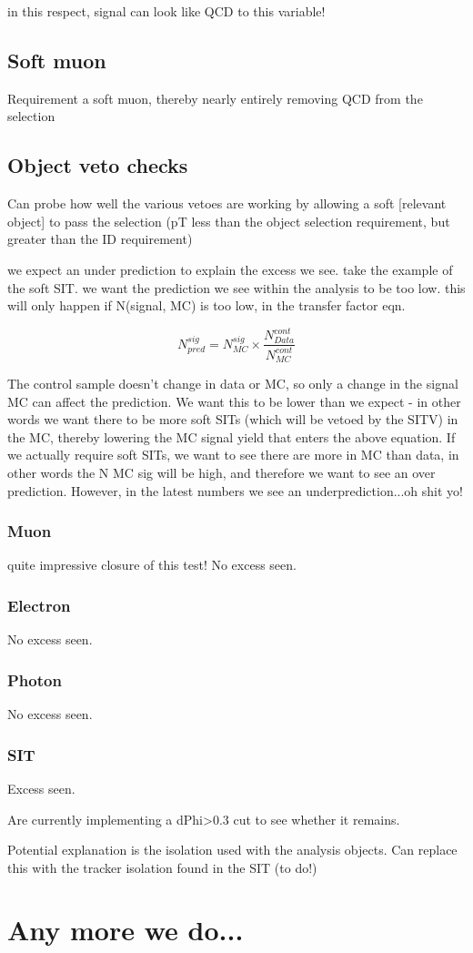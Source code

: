 in this respect, signal can look like QCD to this variable!

\subsection{Soft muon}
Requirement a soft muon, thereby nearly entirely removing QCD from the 
selection

\subsection{Object veto checks}
Can probe how well the various vetoes are working by allowing a soft [relevant 
object] to pass the selection (pT less than the object selection requirement, 
but greater than the ID requirement)


we expect an under prediction to explain the excess we see. 
take the example of the soft SIT. we want the prediction we see within the 
analysis to be too low. this will only happen if N(signal, MC) is too low, in 
the transfer factor eqn.

\begin{equation}
N_{pred}^{sig} = N_{MC}^{sig} \times \frac{N_{Data}^{cont}}{N_{MC}^{cont}}
\end{equation}

The control sample doesn't change in data or MC, so only a change in the signal 
MC can affect the prediction. We want this to be lower than we expect - in other
words we want there to be more soft SITs (which will be vetoed by the SITV) in 
the MC, thereby lowering the MC signal yield that enters the above equation. If 
we actually require soft SITs, we want to see there are more in MC than data, in
other words the N MC sig will be high, and therefore we want to see an over 
prediction. However, in the latest numbers we see an underprediction...oh shit 
yo!


\subsubsection{Muon}
quite impressive closure of this test! No excess seen.

\subsubsection{Electron}
No excess seen.

\subsubsection{Photon}
No excess seen.

\subsubsection{SIT}
Excess seen.

Are currently implementing a dPhi>0.3 cut to see whether it remains.

Potential explanation is the isolation used with the analysis objects. Can 
replace this with the tracker isolation found in the SIT (to do!) 

\section{Any more we do...}
